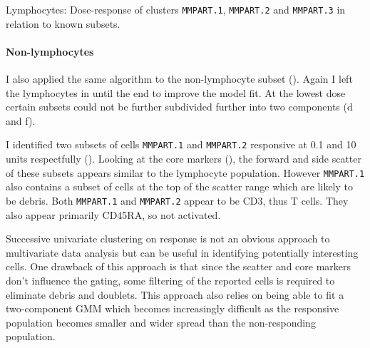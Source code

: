 %
{ Lymphocytes: Dose-response of clusters \texttt{MMPART.1}, \texttt{MMPART.2} and \texttt{MMPART.3} in relation to known subsets. }
{ }

\clearpage


\paragraph{Non-lymphocytes}

I also applied the same algorithm to the non-lymphocyte subset ().
Again I left the lymphocytes in until the end to improve the model fit.
At the lowest dose certain subsets could not be further subdivided further into two components (d and f).

I identified two subsets of cells \texttt{MMPART.1} and \texttt{MMPART.2} responsive at 0.1 and 10 units respectfully ().
Looking at the core markers (), the forward and side scatter of these subsets appears similar to the lymphocyte population.
However \texttt{MMPART.1} also contains a subset of cells at the top of the scatter range which are likely to be debris.
Both \texttt{MMPART.1} and \texttt{MMPART.2} appear to be CD3\positive, thus T cells.
They also appear primarily CD45RA\negative, so not activated.


Successive univariate clustering on response is not an obvious approach to multivariate data analysis but can be useful in identifying potentially interesting cells.
One drawback of this approach is that since the scatter and core markers don't influence the gating, some filtering of the reported cells is required to eliminate
debris and doublets.
This approach also relies on being able to fit a two-component \gls{GMM} which becomes increasingly difficult as the responsive population becomes smaller and wider
spread than the non-responding population.


